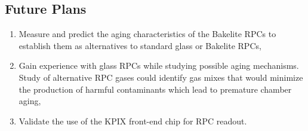 \subsection{Future Plans}
\begin{enumerate}
\item Measure and predict the aging characteristics of the Bakelite RPCs to establish them as alternatives to standard glass or Bakelite RPCs,
\item Gain experience with glass RPCs while studying possible aging mechanisms. Study of alternative RPC gases could identify gas mixes that would minimize the production of harmful contaminants which lead to premature chamber aging,
\item Validate the use of the KPIX front-end chip for RPC readout.
\end{enumerate}


%
%
%
%
%
%
